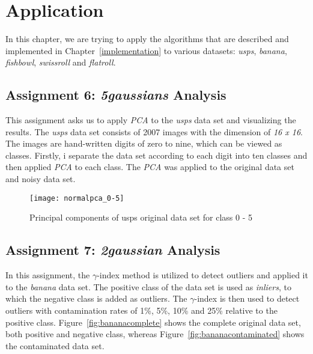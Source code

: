 \chapter{Application}
\label{chap:application}

In this chapter, we are trying to apply the algorithms that are described and implemented in Chapter~\ref{implementation} to various datasets: \textit{usps}, \textit{banana}, \textit{fishbowl}, \textit{swissroll} and \textit{flatroll}.


\section{Assignment 6: \textit{5gaussians} Analysis}
\label{assignment6}

This assignment asks us to apply \textit{PCA} to the \textit{usps} data set and visualizing the results. The \textit{usps} data set consists of 2007 images with the dimension of \textit{16 x 16}. The images are hand-written digits of zero to nine, which can be viewed as classes. Firstly, i separate the data set according to each digit into ten classes and then applied \textit{PCA} to each class. The \textit{PCA} was applied to the original data set and noisy data set.



\begin{figure}[h!]
	\centering
	\texttt{[image: normalpca\_0-5]}
	\caption{Principal components of usps original data set for class 0 - 5}
	\label{fig:pcaOriginal05}
\end{figure}


\section{Assignment 7: \textit{2gaussian} Analysis}
\label{assignment7}

In this assignment, the $\gamma$-index method is utilized to detect outliers and applied it to the \textit{banana} data set. The positive class of the data set is used as \textit{inliers}, to which the negative class is added as outliers. The $\gamma$-index is then used to detect outliers with contamination rates of 1\%, 5\%, 10\% and 25\% relative to the positive class. Figure~\ref{fig:bananacomplete} shows the complete original data set, both positive and negative class, whereas Figure~\ref{fig:bananacontaminated} shows the contaminated data set.

